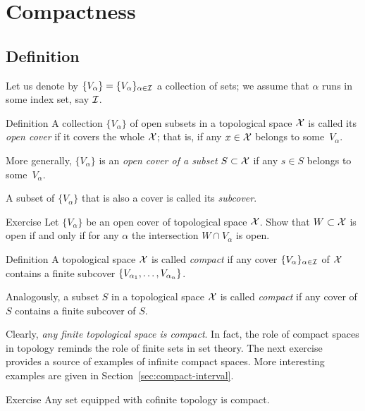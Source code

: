 \chapter{Compactness}

\section{Definition}

Let us denote by $\{V_\alpha\}=\{V_\alpha\}_{\alpha\in \mathcal{I}}$ a collection of sets;
we assume that $\alpha$ runs in some index set, say $\mathcal{I}$.

\begin{thm}{Definition}
A collection $\{V_\alpha\}$ of open subsets in a topological space $\mathcal{X}$ is called its \emph{open cover} if it covers the whole $\mathcal{X}$;
that is, if any $x\in \mathcal{X}$ belongs to some~$V_\alpha$.

More generally, $\{V_\alpha\}$ is an \emph{open cover of a subset} $S\subset \mathcal{X}$ if any $s\in S$ belongs to some~$V_\alpha$.

A subset of $\{V_\alpha\}$ that is also a cover is called its \emph{subcover}.
\end{thm}

\begin{thm}{Exercise}\label{ex:open-open-cover}
Let $\{V_\alpha\}$ be an open cover of topological space $\mathcal{X}$.
Show that $W\subset \mathcal{X}$ is open if and only if for any $\alpha$ the intersection $W\cap V_\alpha$ is open.  
\end{thm}

\begin{thm}{Definition}
A topological space $\mathcal{X}$ is called \emph{compact} if any cover $\{V_\alpha\}_{\alpha\in\mathcal{I}}$ of $\mathcal{X}$
contains a finite subcover $\{V_{\alpha_1},\z\dots,V_{\alpha_n}\}$.

Analogously, a subset $S$ in a topological space $\mathcal{X}$ is called \emph{compact} if any cover of $S$
contains a finite subcover of $S$.
\end{thm}

Clearly, \textit{any finite topological space is compact}.
In fact, the role of compact spaces in topology reminds the role of finite sets in set theory.
The next exercise provides a source of examples of infinite compact spaces.
More interesting examples are given in Section~\ref{sec:compact-interval}.

\begin{thm}{Exercise}\label{ex:cofinite-compact}
Any set equipped with cofinite topology is compact. 
\end{thm}

